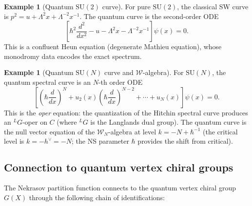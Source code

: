 \documentclass[11pt]{article}
\theoremstyle{definition}
\newtheorem{example}[theorem]{Example}
\theoremstyle{remark}
\newcommand{\cW}{\mathcal{W}}
\newcommand{\SU}{\mathrm{SU}}
\begin{document}
\begin{example}[Quantum $\SU(2)$ curve]
 \label{ex:quantum-su2}
 For pure $\SU(2)$, the classical SW curve is $p^2 = u + \Lambda^2 x + \Lambda^{-2} x^{-1}$.
 The quantum curve is the second-order ODE
 \begin{equation}
 \label{eq:quantum-su2}
 \left[\hbar^2 \frac{d^2}{dx^2} - u - \Lambda^2 x - \Lambda^{-2} x^{-1}\right] \psi(x) = 0.
 \end{equation}
 This is a confluent Heun equation (degenerate Mathieu equation), whose monodromy data encodes
 the exact spectrum.
\end{example}

\begin{example}[Quantum $\SU(N)$ curve and $\cW$-algebra]
 \label{ex:quantum-sun-walgebra}
 For $\SU(N)$, the quantum spectral curve is an $N$-th order ODE
 \begin{equation}
 \label{eq:quantum-sun}
 \left[\left(\hbar \frac{d}{dx}\right)^N + u_2(x) \left(\hbar \frac{d}{dx}\right)^{N-2} + \cdots + u_N(x) \right] \psi(x) = 0.
 \end{equation}
 This is the \emph{oper} equation: the quantization of the Hitchin spectral curve produces an
 ${}^L G$-oper on $C$ (where ${}^L G$ is the Langlands dual group). The quantum curve is
 the null vector equation of the $\cW_N$-algebra at level $k = -N + \hbar^{-1}$ (the critical
 level is $k = -h^\vee = -N$; the NS parameter $\hbar$ provides the shift from critical).
\end{example}

\subsection{Connection to quantum vertex chiral groups}
\label{subsec:nekrasov-qvcg}

The Nekrasov partition function connects to the quantum vertex chiral group $G(X)$ through
the following chain of identifications:
\end{document}
